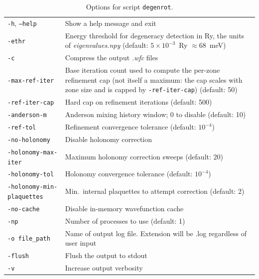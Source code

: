 \documentclass[a4paper,12pt]{report}
\begin{document}
\begin{table}[ht]
 \centering
 \caption{Options for script \texttt{degenrot}.}\label{tab:options_degenrot}
\begin{tabularx}{\textwidth}{lX}
\hline
  \texttt{-h}, \texttt{--help}       & Show a help message and exit \\
  \texttt{-ethr}                     & Energy threshold for degeneracy detection in Ry, the units of \emph{eigenvalues.npy} (default: $5\times10^{-3}$~Ry $\approx 68$~meV) \\
  \texttt{-c}                        & Compress the output \emph{.wfc} files \\
  \texttt{-max-ref-iter}             & Base iteration count used to compute the per-zone refinement cap (not itself a maximum: the cap scales with zone size and is capped by \texttt{-ref-iter-cap}) (default: 50) \\
  \texttt{-ref-iter-cap}             & Hard cap on refinement iterations (default: 500) \\
  \texttt{-anderson-m}               & Anderson mixing history window; 0 to disable (default: 10) \\
  \texttt{-ref-tol}                  & Refinement convergence tolerance (default: $10^{-4}$) \\
  \texttt{-no-holonomy}              & Disable holonomy correction \\
  \texttt{-holonomy-max-iter}        & Maximum holonomy correction sweeps (default: 20) \\
  \texttt{-holonomy-tol}             & Holonomy convergence tolerance (default: $10^{-4}$) \\
  \texttt{-holonomy-min-plaquettes}  & Min.\ internal plaquettes to attempt correction (default: 2) \\
  \texttt{-no-cache}                 & Disable in-memory wavefunction cache \\
  \texttt{-np}                       & Number of processes to use (default: 1) \\
  \texttt{-o file\_path}             & Name of output log file. Extension will be .log regardless of user input \\
  \texttt{-flush}                    & Flush the output to stdout \\
  \texttt{-v}                        & Increase output verbosity \\
\hline
\end{tabularx}
\end{table}
\end{document}

